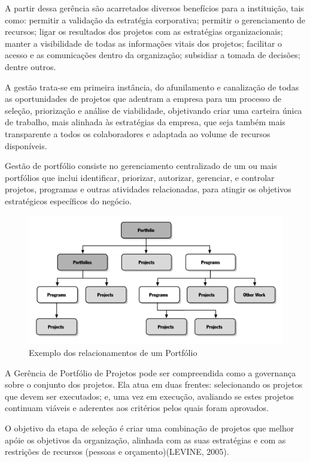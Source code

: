 \documentclass[12pt,a4paper,ruledheader,tocpage=prefix,floatnumber=continuous,pagestart=folhaderosto,font=times]{abnt}
\begin{document}
A partir dessa gerência são acarretados diversos  benefícios para a instituição, tais como: permitir a validação da estratégia corporativa; 
permitir o gerenciamento de recursos; ligar os resultados dos projetos com as estratégias organizacionais; manter a visibilidade de todas as 
informações vitais dos projetos; facilitar o acesso e as comunicações dentro da organização; subsidiar a tomada de decisões; dentre outros. 

A gestão trata-se em primeira instância, do afunilamento e canalização de todas as oportunidades de projetos que adentram a empresa para um processo de 
seleção, priorização e análise de viabilidade, objetivando criar uma carteira única de trabalho, mais alinhada às estratégias da empresa, que seja 
também mais transparente a todos os colaboradores e adaptada ao volume de recursos disponíveis.

Gestão de portfólio consiste no gerenciamento centralizado de um ou mais portfólios  que inclui identificar, priorizar, autorizar, gerenciar, e 
controlar projetos, programas e outras atividades relacionadas, para atingir os objetivos estratégicos específicos do negócio.\cite{mps}

\begin{figure}[H]
\centering
\includegraphics[width=.9\textwidth]{flow_sppm.jpg}
\caption{Exemplo dos relacionamentos de um Portfólio}
\end{figure} 

A Gerência de Portfólio de Projetos pode ser compreendida como a governança sobre o conjunto dos projetos. Ela atua em duas frentes: selecionando os 
projetos que devem ser executados; e, uma vez em execução, avaliando se estes projetos continuam viáveis e aderentes aos critérios pelos quais foram
aprovados.

O objetivo da etapa de seleção é criar uma combinação de projetos que melhor apóie os objetivos da organização, alinhada com as suas estratégias e 
com as restrições de recursos (pessoas e orçamento)(LEVINE, 2005).
\end{document}
